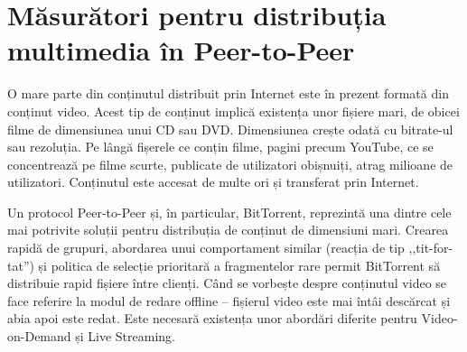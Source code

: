 
\chapter{Măsurători pentru distribuția multimedia în Peer-to-Peer}
\label{chapter:multimedia-dist}

O mare parte din conținutul distribuit prin Internet este în prezent formată
din conținut video. Acest tip de conținut implică existența unor fișiere mari,
de obicei filme de dimensiunea unui CD sau DVD. Dimensiunea crește odată
cu bitrate-ul sau rezoluția. Pe lângă fișerele ce conțin filme, pagini
precum YouTube, ce se concentrează pe filme scurte, publicate de
utilizatori obișnuiți, atrag milioane de utilizatori. Conținutul este
accesat de multe ori și transferat prin Internet.

Un protocol Peer-to-Peer și, în particular, BitTorrent, reprezintă una dintre
cele mai potrivite soluții pentru distribuția de conținut de dimensiuni mari.
Crearea rapidă de grupuri, abordarea unui comportament similar (reacția de tip
,,tit-for-tat'') și politica de selecție prioritară a fragmentelor rare permit
BitTorrent să distribuie rapid fișiere între clienți. Când se vorbește despre
conținutul video se face referire la modul de redare offline -- fișierul video
este mai întâi descărcat și abia apoi este redat. Este necesară existența unor
abordări diferite pentru Video-on-Demand și Live Streaming.

